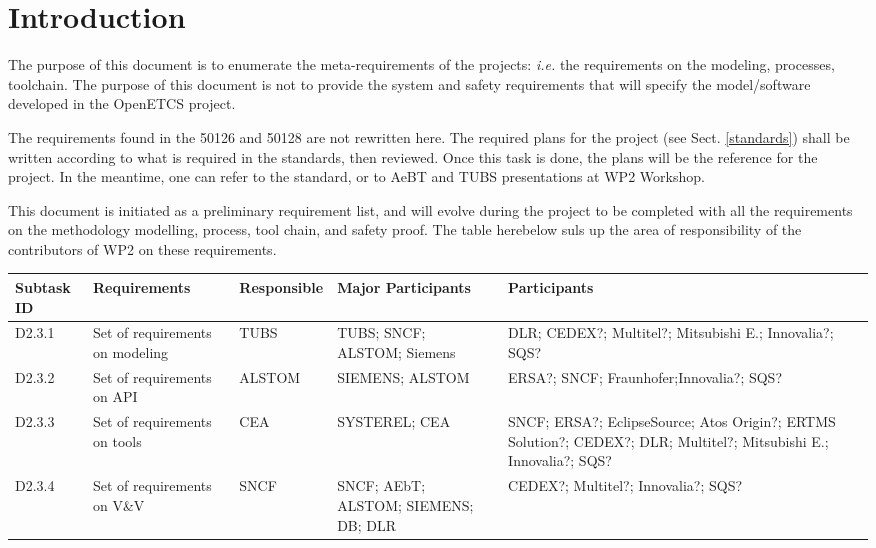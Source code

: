 \documentclass{template/openetcs_article}
\begin{document}
\newenvironment{comment}{
	\begin{quote}
	\begin{itshape}Comment. 
}{
	\end{itshape}
	\end{quote}
}

\newenvironment{justif}{
	\begin{quote}
	\begin{itshape}Justification. 
}{
	\end{itshape}
	\end{quote}
}


\def\reqt{R-WP2/D2.3.0}
\section{Introduction}
The purpose of this document is to enumerate the meta-requirements of the projects: \emph{i.e.} 
the requirements on the modeling, processes, toolchain. The purpose of this document is 
not to provide the system and safety requirements that will specify the model/software 
developed in the OpenETCS project.

The requirements found in the 50126 and 50128 are not rewritten here. The required plans for the 
project (see Sect. \ref{standards}) shall be written according to what is required in the standards,
then reviewed. Once this task is done, the plans will be the reference for the project.
In the meantime, one can refer to the standard, or to AeBT and TUBS presentations at WP2 Workshop.

This document is initiated as a preliminary requirement list, and will evolve during the project 
to be completed with all the requirements on the methodology
modelling, process, tool chain, and safety proof. The table herebelow suls up the area of responsibility
of the contributors of WP2 on these requirements.

\small
\begin{tabular}{|p{1.1cm}|p{1.8cm}|p{1.8cm}|p{3.2cm}|p{4.2cm}|}
\hline
Subtask ID & Requirements & Responsible & Major Participants & Participants \\
\hline
D2.3.1 & Set of requirements on modeling & TUBS & TUBS; SNCF; ALSTOM; Siemens & 
DLR; CEDEX?; Multitel?; Mitsubishi E.; Innovalia?; SQS? \\
\hline
D2.3.2 & Set of requirements on API & ALSTOM & SIEMENS; ALSTOM & 
ERSA?; SNCF; Fraunhofer;Innovalia?; SQS? \\
\hline
D2.3.3 &  Set of requirements on tools & CEA & SYSTEREL; CEA & 
SNCF; ERSA?; EclipseSource; Atos Origin?; ERTMS Solution?; CEDEX?; DLR; 
Multitel?; Mitsubishi E.; Innovalia?; SQS? \\
\hline
D2.3.4 & Set of requirements on V\&V & SNCF & SNCF; AEbT; ALSTOM; SIEMENS; DB; DLR & 
CEDEX?; Multitel?; Innovalia?; SQS? \\ 
\hline
\end{tabular}
\normalsize
\end{document}
